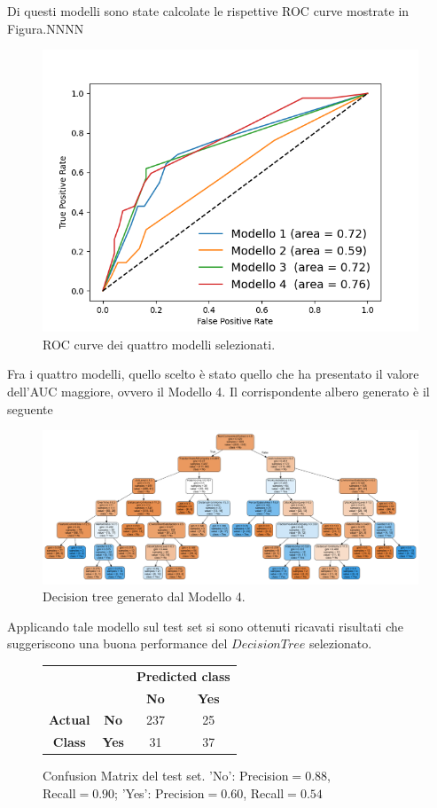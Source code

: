 \documentclass[a4paper,9pt]{article}
\begin{document}
Di questi modelli sono state calcolate le rispettive ROC curve mostrate in Figura.NNNN
\begin{figure}[H]
    \centering
    \includegraphics[scale=0.65]{ROC_CURVE.png}
    \caption{ROC curve dei quattro modelli selezionati.}
    \label{fig:my_label}
\end{figure}
Fra i quattro modelli, quello scelto è stato quello che ha presentato il valore dell'AUC maggiore, ovvero il Modello 4. Il corrispondente albero generato è il seguente

\begin{figure}[H]
    \centering
    \includegraphics[scale=0.40]{Modello 4 (scelto).png}
    \caption{Decision tree generato dal Modello 4.}
    \label{fig:my_label}
\end{figure}

Applicando tale modello sul test set si sono ottenuti ricavati risultati che suggeriscono una buona performance del $Decision Tree$ selezionato.

\begin{figure}[H]
    \centering
\begin{tabular}{cc|cc}
\toprule
&\bfseries      & \multicolumn{2}{c}{\bfseries Predicted class} \\
& & \bfseries No & \bfseries Yes \\
\midrule
\bfseries Actual&\bfseries No  & 237 & 25  \\
\bfseries Class &\bfseries Yes & 31 & 37  \\
\bottomrule
\end{tabular}
\caption{Confusion Matrix del test set. 'No': Precision$=0.88$,\\ \qquad \qquad Recall$=0.90$; 'Yes': Precision$=0.60$, Recall$=0.54$}
\end{figure}
\end{document}
